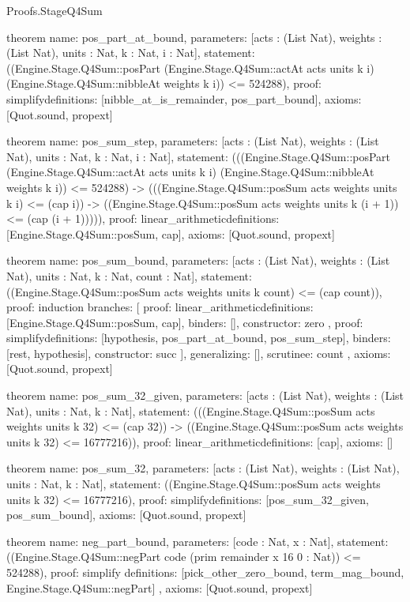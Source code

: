 \begin{lexlean}{Proofs.StageQ4Sum}
\begin{semanticmodule}
theorem{
  name: pos_part_at_bound,
  parameters: [acts : (List Nat), weights : (List Nat), units : Nat, k : Nat, i : Nat],
  statement: ((Engine.Stage.Q4Sum::posPart (Engine.Stage.Q4Sum::actAt acts units k i) (Engine.Stage.Q4Sum::nibbleAt weights k i)) <= 524288),
  proof: simplify{definitions: [nibble_at_is_remainder, pos_part_bound]},
  axioms: [Quot.sound, propext]
}

theorem{
  name: pos_sum_step,
  parameters: [acts : (List Nat), weights : (List Nat), units : Nat, k : Nat, i : Nat],
  statement: (((Engine.Stage.Q4Sum::posPart (Engine.Stage.Q4Sum::actAt acts units k i) (Engine.Stage.Q4Sum::nibbleAt weights k i)) <= 524288) -> (((Engine.Stage.Q4Sum::posSum acts weights units k i) <= (cap i)) -> ((Engine.Stage.Q4Sum::posSum acts weights units k (i + 1)) <= (cap (i + 1))))),
  proof: linear_arithmetic{definitions: [Engine.Stage.Q4Sum::posSum, cap]},
  axioms: [Quot.sound, propext]
}

theorem{
  name: pos_sum_bound,
  parameters: [acts : (List Nat), weights : (List Nat), units : Nat, k : Nat, count : Nat],
  statement: ((Engine.Stage.Q4Sum::posSum acts weights units k count) <= (cap count)),
  proof: induction{
    branches: [
      {
        proof: linear_arithmetic{definitions: [Engine.Stage.Q4Sum::posSum, cap]},
        binders: [],
        constructor: zero
      },
      {
        proof: simplify{definitions: [hypothesis, pos_part_at_bound, pos_sum_step]},
        binders: [rest, hypothesis],
        constructor: succ
      }
    ],
    generalizing: [],
    scrutinee: count
  },
  axioms: [Quot.sound, propext]
}

theorem{
  name: pos_sum_32_given,
  parameters: [acts : (List Nat), weights : (List Nat), units : Nat, k : Nat],
  statement: (((Engine.Stage.Q4Sum::posSum acts weights units k 32) <= (cap 32)) -> ((Engine.Stage.Q4Sum::posSum acts weights units k 32) <= 16777216)),
  proof: linear_arithmetic{definitions: [cap]},
  axioms: []
}

theorem{
  name: pos_sum_32,
  parameters: [acts : (List Nat), weights : (List Nat), units : Nat, k : Nat],
  statement: ((Engine.Stage.Q4Sum::posSum acts weights units k 32) <= 16777216),
  proof: simplify{definitions: [pos_sum_32_given, pos_sum_bound]},
  axioms: [Quot.sound, propext]
}

theorem{
  name: neg_part_bound,
  parameters: [code : Nat, x : Nat],
  statement: ((Engine.Stage.Q4Sum::negPart code (prim remainder x 16 0 : Nat)) <= 524288),
  proof: simplify{
    definitions: [pick_other_zero_bound, term_mag_bound, Engine.Stage.Q4Sum::negPart]
  },
  axioms: [Quot.sound, propext]
}


\end{semanticmodule}
\end{lexlean}

